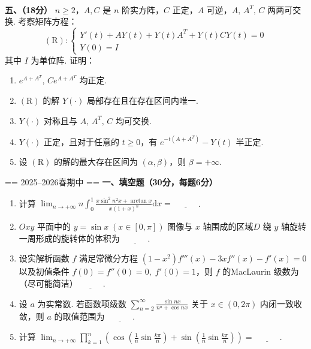 \\

\textbf{五、（18分）}
$n\geq2$，$A,C$ 是 $n$ 阶实方阵，$C$ 正定，$A$ 可逆，$A,\,A^T,\,C$ 两两可交换. 考察矩阵方程：
$$(\mathrm R):\left\{\begin{array}{l}
    Y'(t)+AY(t)+Y(t)A^T+Y(t)CY(t)=0\\
    Y(0)=I
\end{array}\right.$$
其中 $I$ 为单位阵. 证明：
\begin{enumerate}
    \item $e^{A+A^T},\,Ce^{A+A^T}$ 均正定.
    \item $(\mathrm R)$ 的解 $Y(\cdot)$ 局部存在且在存在区间内唯一.
    \item $Y(\cdot)$ 对称且与 $A,\,A^T,\,C$ 均可交换.
    \item $Y(\cdot)$ 正定，且对于任意的 $t\geq0$，有 $e^{-t(A+A^T)}-Y(t)$ 半正定.
    \item 设 $(\mathrm R)$ 的解的最大存在区间为 $(\alpha,\beta)$，则 $\beta=+\infty$.
\end{enumerate}

== 2025--2026春期中 ==
\textbf{一、填空题（30分，每题6分）}

\begin{enumerate}[label=(\arabic*)]
    \item 计算 $\displaystyle\lim_{n\to+\infty}n\int_0^1\frac{x\sin^2n^2x+\arctan x}{x(1+x)^n}\mathrm{d}x=\underline{\qquad\quad}$.
    \item $Oxy$ 平面中的 $y=\sin x\;(x\in[0,\pi])$ 图像与 $x$ 轴围成的区域$D$ 绕 $y$ 轴旋转一周形成的旋转体的体积为 $\underline{\qquad\quad}$.
    \item 设实解析函数 $f$ 满足常微分方程 $(1-x^2)f'''(x)-3xf''(x)-f'(x)=0$ 以及初值条件 $f(0)=f''(0)=0,\;f'(0)=1$，则 $f$ 的MacLaurin 级数为（尽可能简洁）$\underline{\qquad\quad}$.
    \item 设 $a$ 为实常数. 若函数项级数 $\displaystyle\sum_{n=2}^{\infty}\frac{\sin nx}{n^{a}+\cos nx}$ 关于 $x\in(0,2\pi)$ 内闭一致收敛，则 $a$ 的取值范围为 $\underline{\quad\qquad}$.
    \item 计算 $\displaystyle\lim_{n\to+\infty}\prod_{k=1}^n\left(\cos\left(\frac1n\sin\frac{k\pi}n\right)+\sin\left(\frac1n\sin\frac{k\pi}n\right)\right)=\underline{\quad\qquad}$.
\end{enumerate}

\\

